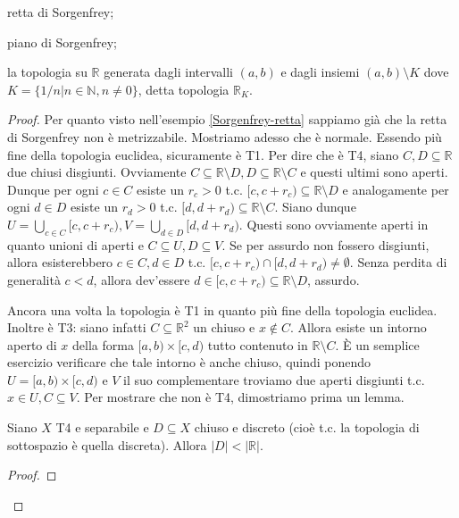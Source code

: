 \begin{ex}
  \begin{nlist}
    \item retta di Sorgenfrey;
    \item piano di Sorgenfrey;
    \item la topologia su $\mathbb{R}$ generata dagli intervalli $(a, b)$ e dagli insiemi $(a, b) \setminus K$ dove $K= \{ 1/n | n \in \mathbb{N}, n \not=0 \}$, detta topologia $\mathbb{R}_K$.
\end{nlist}
\end{ex}

\begin{proof}
  Per quanto visto nell'esempio \ref{Sorgenfrey-retta} sappiamo già che la retta di Sorgenfrey non è metrizzabile. Mostriamo adesso che è normale. Essendo più fine della topologia euclidea, sicuramente è T1. Per dire che è T4, siano $C, D \subseteq \mathbb{R}$ due chiusi disgiunti. Ovviamente $C \subseteq \mathbb{R} \setminus D, D \subseteq \mathbb{R} \setminus C$ e questi ultimi sono aperti. Dunque per ogni $c \in C$ esiste un  $r_c>0$ t.c. $[c, c+r_c) \subseteq \mathbb{R} \setminus D$ e analogamente per ogni
  $d \in D$ esiste un $r_d>0$ t.c. $[d, d+r_d) \subseteq \mathbb{R} \setminus C$. Siano dunque $\displaystyle U =\bigcup_{c \in C} [c, c+r_c), V=\bigcup_{d \in D} [d, d+r_d)$. Questi sono ovviamente aperti in quanto unioni di aperti e $C \subseteq U, D \subseteq V$. Se per assurdo non fossero disgiunti, allora esisterebbero $c \in C, d \in D$ t.c. $[c, c+r_c) \cap [d, d+r_d) \not= \emptyset$. Senza perdita di generalità $c<d$, allora dev'essere
  $d \in [c, c+r_c) \subseteq \mathbb{R} \setminus D$, assurdo.
  \item Ancora una volta la topologia è T1 in quanto più fine della topologia euclidea. Inoltre è T3: siano infatti $C \subseteq \mathbb{R}^2$ un chiuso e $x \not \in C$. Allora esiste un intorno aperto di $x$ della forma $[a, b) \times [c, d)$ tutto contenuto in $\mathbb{R} \setminus C$. È un semplice esercizio verificare che tale intorno è anche chiuso, quindi ponendo $U=[a, b) \times [c, d)$ e $V$ il suo complementare troviamo due aperti disgiunti t.c. $x \in U, C \subseteq V$.
  Per mostrare che non è T4, dimostriamo prima un lemma.
  \begin{lm}
    Siano $X$ T4 e separabile e $D \subseteq X$ chiuso e discreto (cioè t.c. la topologia di sottospazio è quella discreta). Allora $|D| < |\mathbb{R}|$.
  \end{lm}
  \begin{proof}

\end{proof}
\end{proof}
